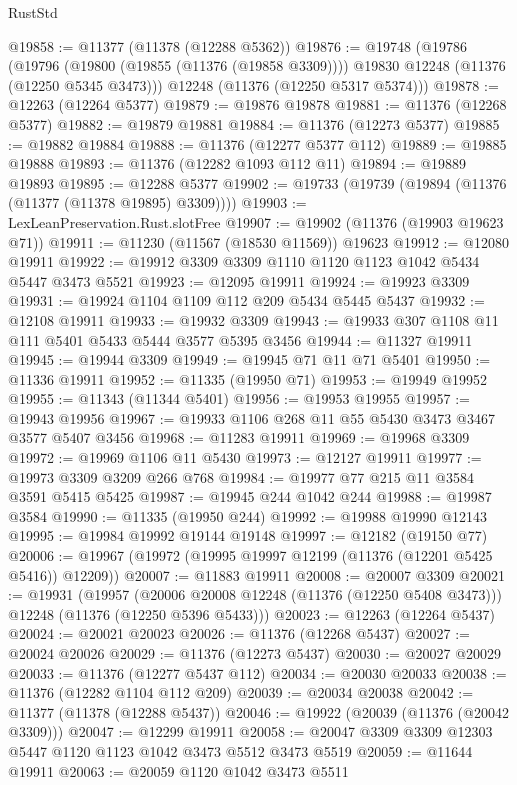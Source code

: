 \begin{lexlean}{RustStd}
\begin{coremodule}
{{{{{{{{{{{{{{{{{{{@19858 := @11377 (@11378 (@12288 @5362))
@19876 := @19748
    (@19786
      (@19796 (@19800 (@19855 (@11376 (@19858 @3309)))) @19830 @12248 (@11376 (@12250 @5345 @3473)))
      @12248
      (@11376 (@12250 @5317 @5374)))
@19878 := @12263 (@12264 @5377)
@19879 := @19876 @19878
@19881 := @11376 (@12268 @5377)
@19882 := @19879 @19881
@19884 := @11376 (@12273 @5377)
@19885 := @19882 @19884
@19888 := @11376 (@12277 @5377 @112)
@19889 := @19885 @19888
@19893 := @11376 (@12282 @1093 @112 @11)
@19894 := @19889 @19893
@19895 := @12288 @5377
@19902 := @19733 (@19739 (@19894 (@11376 (@11377 (@11378 @19895) @3309))))
@19903 := LexLeanPreservation.Rust.slotFree
@19907 := @19902 (@11376 (@19903 @19623 @71))
@19911 := @11230 (@11567 (@18530 @11569)) @19623
@19912 := @12080 @19911
@19922 := @19912 @3309 @3309 @1110 @1120 @1123 @1042 @5434 @5447 @3473 @5521
@19923 := @12095 @19911
@19924 := @19923 @3309
@19931 := @19924 @1104 @1109 @112 @209 @5434 @5445 @5437
@19932 := @12108 @19911
@19933 := @19932 @3309
@19943 := @19933 @307 @1108 @11 @111 @5401 @5433 @5444 @3577 @5395 @3456
@19944 := @11327 @19911
@19945 := @19944 @3309
@19949 := @19945 @71 @11 @71 @5401
@19950 := @11336 @19911
@19952 := @11335 (@19950 @71)
@19953 := @19949 @19952
@19955 := @11343 (@11344 @5401)
@19956 := @19953 @19955
@19957 := @19943 @19956
@19967 := @19933 @1106 @268 @11 @55 @5430 @3473 @3467 @3577 @5407 @3456
@19968 := @11283 @19911
@19969 := @19968 @3309
@19972 := @19969 @1106 @11 @5430
@19973 := @12127 @19911
@19977 := @19973 @3309 @3209 @266 @768
@19984 := @19977 @77 @215 @11 @3584 @3591 @5415 @5425
@19987 := @19945 @244 @1042 @244
@19988 := @19987 @3584
@19990 := @11335 (@19950 @244)
@19992 := @19988 @19990 @12143
@19995 := @19984 @19992 @19144 @19148
@19997 := @12182 (@19150 @77)
@20006 := @19967 (@19972 (@19995 @19997 @12199 (@11376 (@12201 @5425 @5416)) @12209))
@20007 := @11883 @19911
@20008 := @20007 @3309
@20021 := @19931
    (@19957
      (@20006 @20008 @12248 (@11376 (@12250 @5408 @3473)))
      @12248
      (@11376 (@12250 @5396 @5433)))
@20023 := @12263 (@12264 @5437)
@20024 := @20021 @20023
@20026 := @11376 (@12268 @5437)
@20027 := @20024 @20026
@20029 := @11376 (@12273 @5437)
@20030 := @20027 @20029
@20033 := @11376 (@12277 @5437 @112)
@20034 := @20030 @20033
@20038 := @11376 (@12282 @1104 @112 @209)
@20039 := @20034 @20038
@20042 := @11377 (@11378 (@12288 @5437))
@20046 := @19922 (@20039 (@11376 (@20042 @3309)))
@20047 := @12299 @19911
@20058 := @20047 @3309 @3309 @12303 @5447 @1120 @1123 @1042 @3473 @5512 @3473 @5519
@20059 := @11644 @19911
@20063 := @20059 @1120 @1042 @3473 @5511
}}}}}}}}}}}}}}}}}}}
\end{coremodule}
\end{lexlean}

